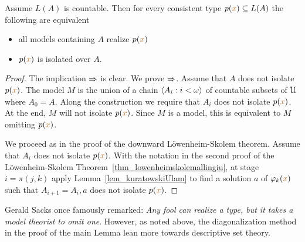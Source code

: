\begin{void} Assume $L(A)$ is countable.
Then for every consistent type $p({\color{brown} x})\subseteq L(A)$ the following are equivalent
\begin{itemize}   
\item[1.] all models containing $A$ realize $p({\color{brown} x})$
\item[2.] $p({\color{brown} x})$ is isolated over $A$.
\end{itemize}
\end{void}

\begin{proof}
The implication $\Rightarrow$ is clear. 
We prove $\Rightarrow$.
Assume that $A$ does not isolate $p({\color{brown} x})$.
The model $M$ is the union of a chain $\langle A_i:i<\omega\rangle$ of countable subsets of $\EuScript U$ where $A_0=A$.
Along the construction we require that $A_i$ does not isolate $p({\color{brown} x})$.
At the end, $M$ will not isolate $p({\color{brown} x})$.
Since $M$ is a model, this is equivalent to $M$ omitting $p({\color{brown} x})$.

We proceed as in the proof of the downward L\"owenheim-Skolem theorem.
Assume that $A_i$ does not isolate $p({\color{brown} x})$.
With the notation in the second proof of the L\"owenheim-Skolem Theorem~\ref{thm_lowenheimskolemallingiu}, at stage $i=\pi(j,k)$ apply Lemma~\ref{lem_kuratowskiUlam} to find a solution $a$ of $\varphi_k({\color{brown} x})$ such that $A_{i+1}=A_i,a$ does not isolate $p({\color{brown} x})$.
\end{proof}

Gerald Sacks once famously remarked: \textit{Any fool can realize a type, but it takes a model theorist to omit one}.
However, as noted above, the diagonalization method in the proof of the main Lemma lean more towards descriptive set theory.

